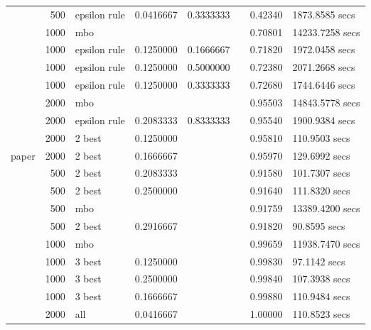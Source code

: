 \begin{longtable}[t]{lrlrrrrl}
 & 500 & epsilon rule & 0.0416667 & 0.3333333 &  & 0.42340 & 1873.8585 secs\\

 & 1000 & mbo &  &  &  & 0.70801 & 14233.7258 secs\\

 & 1000 & epsilon rule & 0.1250000 & 0.1666667 &  & 0.71820 & 1972.0458 secs\\

 & 1000 & epsilon rule & 0.1250000 & 0.5000000 &  & 0.72380 & 2071.2668 secs\\

 & 1000 & epsilon rule & 0.1250000 & 0.3333333 &  & 0.72680 & 1744.6446 secs\\

 & 2000 & mbo &  &  &  & 0.95503 & 14843.5778 secs\\

 & 2000 & epsilon rule & 0.2083333 & 0.8333333 &  & 0.95540 & 1900.9384 secs\\

 & 2000 & 2 best & 0.1250000 &  &  & 0.95810 & 110.9503 secs\\

\multirow{-12}{*}{\raggedright\arraybackslash paper} & 2000 & 2 best & 0.1666667 &  &  & 0.95970 & 129.6992 secs\\
\cmidrule{1-8}
 & 500 & 2 best & 0.2083333 &  &  & 0.91580 & 101.7307 secs\\

 & 500 & 2 best & 0.2500000 &  &  & 0.91640 & 111.8320 secs\\

 & 500 & mbo &  &  &  & 0.91759 & 13389.4200 secs\\

 & 500 & 2 best & 0.2916667 &  &  & 0.91820 & 90.8595 secs\\

 & 1000 & mbo &  &  &  & 0.99659 & 11938.7470 secs\\

 & 1000 & 3 best & 0.1250000 &  &  & 0.99830 & 97.1142 secs\\

 & 1000 & 3 best & 0.2500000 &  &  & 0.99840 & 107.3938 secs\\

 & 1000 & 3 best & 0.1666667 &  &  & 0.99880 & 110.9484 secs\\

 & 2000 & all & 0.0416667 &  &  & 1.00000 & 110.8523 secs\\


\end{longtable}
